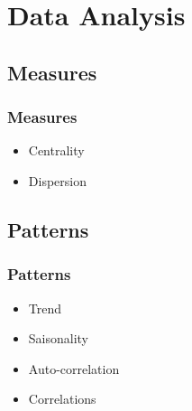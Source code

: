 



\begin{frame}
   \titlepage
\end{frame}



\begin{frame}
   \tableofcontents
\end{frame}

\section{Data Analysis}


\subsection{Measures}

\begin{frame}\frametitle{Measures}
   \begin{itemize}
      \item Centrality
      \item Dispersion
   \end{itemize}
\end{frame}

\subsection{Patterns}

\begin{frame}\frametitle{Patterns}
   \begin{itemize}
      \item Trend
      \item Saisonality
      \item Auto-correlation
      \item Correlations
   \end{itemize}
\end{frame}


